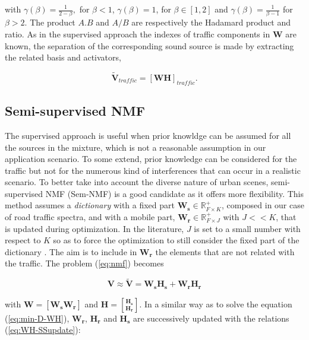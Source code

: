 \documentclass[twocolumn]{svjour3}          %
\begin{document}
with $\gamma(\beta) = \frac{1}{2-\beta},$ for $\beta < 1$, $ \gamma(\beta) = 1$, for $\beta \in \left[1,2\right]$ and $\gamma(\beta) = \frac{1}{\beta-1}$ for $\beta > 2$. The product $A.B$ and $A/B$ are respectively the Hadamard product and ratio. As in the supervised approach the indexes of traffic components in $\mathbf{W}$  are known, the separation of the corresponding sound source is made by extracting the related basis and activators,

\begin{equation}\label{eq:separationExtraction}
\mathbf{\tilde{V}}_{traffic} = \left[ \mathbf{WH} \right]_{traffic}.
\end{equation}

\subsection{Semi-supervised NMF}

The supervised approach is useful when prior knowldge can be assumed for all the sources in the mixture, which is not a reasonable assumption in our application scenario. To some extend, prior knowledge can be considered for the traffic but not for the numerous kind of interferences that can occur in a realistic scenario. To better take into account the diverse nature of urban scenes, semi-supervised NMF (Sem-NMF)\cite{lee_semi-supervised_2010} is a good candidate as it offers more flexibility. This method assumes a \textit{dictionary} with a fixed part $\mathbf{W_s} \in \mathbb{R}^+_{F\times K}$, composed in our case of road traffic spectra, and with a mobile part, $\mathbf{W_r} \in \mathbb{R}^+_{F\times J}$ with $J <<K$, that is updated during optimization. In the literature, $J$ is set to a small number with respect to $K$ so as to force the optimization to still consider the fixed part of the dictionary \cite{lefevre2012semi}. The aim is to include in $\mathbf{W_r}$ the elements that are not related with the traffic. The problem (\ref{eq:nmf}) becomes

\begin{equation}
\mathbf{V} \approx \mathbf{\tilde{V}} = \mathbf{W_s H_s}+ \mathbf{W_r H_r}
\end{equation}

 with $\mathbf{W} = \left[\mathbf{W_s} \mathbf{W_r} \right]$ and $\mathbf{H} = \genfrac[]{0pt}{0}{\mathbf{H_s}}{\mathbf{H_r}}$. In a similar way as to solve the equation (\ref{eq:min-D-WH}), $\mathbf{W_r}$, $\mathbf{H_r}$ and $\mathbf{H_s}$ are successively updated with the relations (\ref{eq:WH-SSupdate}):
\end{document}

